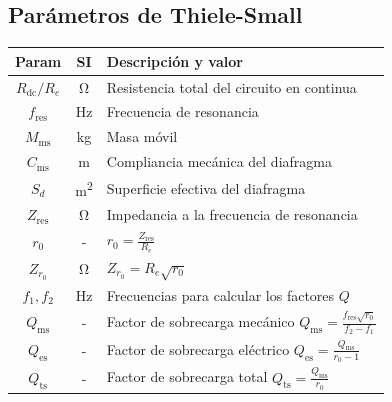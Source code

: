 \documentclass[a4paper, 8pt]{extarticle}
\begin{document}
\begin{multicols}{3}
    \subsection{Parámetros de Thiele-Small}
    \begin{center}
        \begin{tabular}{|c|c|l|}
            \hline
            \textbf{Param}         & \textbf{SI}     & \textbf{Descripción y valor}                                                                  \\
            \hline
            $R _{\text{dc}} / R_e$ & \unit{\ohm}     & Resistencia total del circuito en continua                                                    \\
            $f _{\text{res}}$      & \unit{\hertz}   & Frecuencia de resonancia                                                                      \\
            $M _{\text{ms}}$       & \unit{\kg}      & Masa móvil                                                                                    \\
            $C _{\text{ms}}$       & \unit{\meter}   & Compliancia mecánica del diafragma                                                            \\
            $S_d$                  & \unit{\meter^2} & Superficie efectiva del diafragma                                                             \\
            $Z _{\text{res}} $     & \unit{\ohm}     & Impedancia a la frecuencia de resonancia                                                      \\
            $r_0$                  & -               & $r_0 =\frac{Z _{\text{res}}}{R_e}$                                                            \\
            $Z_{r_0}$              & \unit{\ohm}     & $Z_{r_0}=R_e \sqrt{r_0}$                                                                      \\
            $f_1, f_2$             & \unit{\hertz}   & Frecuencias para calcular los factores $Q$                                                    \\
            $Q _{\text{ms}}$       & -               & Factor de sobrecarga mecánico $Q _{\text{ms}} = \frac{f _{\text{res}} \sqrt{r_0}}{f_2 - f_1}$ \\
            $Q _{\text{es}}$       & -               & Factor de sobrecarga eléctrico $Q _{\text{es}} = \frac{Q _{\text{ms}}}{r_0 - 1}$              \\
            $Q _{\text{ts}}$       & -               & Factor de sobrecarga total $Q _{\text{ts}} = \frac{Q _{\text{ms}}}{r_0}$                      \\
            \hline
        \end{tabular}
    \end{center}


\end{multicols}
\end{document}
